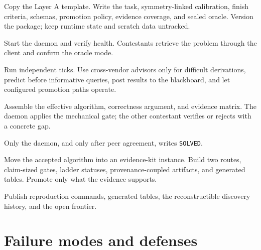\documentclass[11pt]{article}
\newcommand{\code}[1]{\texttt{#1}}
\begin{document}
\begin{description}[style=nextline,leftmargin=1.3cm,labelwidth=1.1cm,itemsep=0.35em]
\item[P0 --- Author.]
Copy the Layer A template.  Write the task, symmetry-linked calibration,
finish criteria, schemas, promotion policy, evidence coverage, and sealed
oracle.  Version the package; keep runtime state and scratch data untracked.

\item[P1 --- Boot.]
Start the daemon and verify health.  Contestants retrieve the problem through
the client and confirm the oracle mode.

\item[P2 --- Contest.]
Run independent ticks.  Use cross-vendor advisors only for difficult
derivations, predict before informative queries, post results to the
blackboard, and let configured promotion paths operate.

\item[P3 --- Finish.]
Assemble the effective algorithm, correctness argument, and evidence matrix.
The daemon applies the mechanical gate; the other contestant verifies or
rejects with a concrete gap.

\item[P4 --- Solve.]
Only the daemon, and only after peer agreement, writes \code{SOLVED}.

\item[P5 --- Consolidate.]
Move the accepted algorithm into an evidence-kit instance.  Build two routes,
claim-sized gates, ladder statuses, provenance-coupled artifacts, and
generated tables.  Promote only what the evidence supports.

\item[P6 --- Ship.]
Publish reproduction commands, generated tables, the reconstructible
discovery history, and the open frontier.
\end{description}

\clearpage

\section{Failure modes and defenses}
\end{document}
